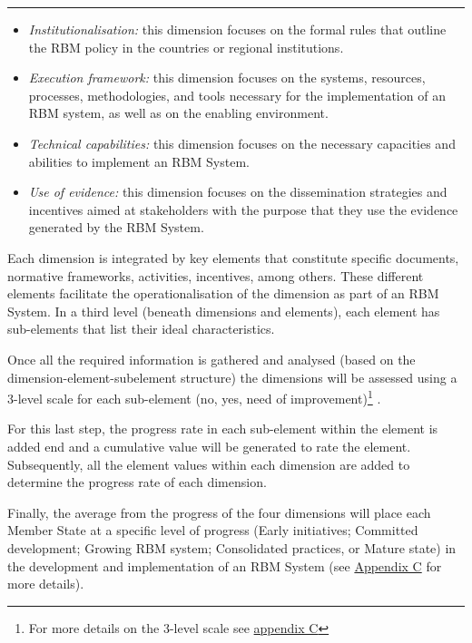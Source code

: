 \documentclass[
  10pt,
]{book}
\begin{document}
\begin{center}\rule{0.5\linewidth}{0.5pt}\end{center}

\begin{itemize}
\item
  \emph{Institutionalisation:} this dimension focuses on the formal rules that outline the RBM policy in the countries or regional institutions.
\item
  \emph{Execution framework:} this dimension focuses on the systems, resources, processes, methodologies, and tools necessary for the implementation of an RBM system, as well as on the enabling environment.
\item
  \emph{Technical capabilities:} this dimension focuses on the necessary capacities and abilities to implement an RBM System.
\item
  \emph{Use of evidence:} this dimension focuses on the dissemination strategies and incentives aimed at stakeholders with the purpose that they use the evidence generated by the RBM System.
\end{itemize}

Each dimension is integrated by key elements that constitute specific documents, normative frameworks, activities, incentives, among others. These different elements facilitate the operationalisation of the dimension as part of an RBM System. In a third level (beneath dimensions and elements), each element has sub-elements that list their ideal characteristics.

Once all the required information is gathered and analysed (based on the dimension-element-subelement structure) the dimensions will be assessed using a 3-level scale for each sub-element (no, yes, need of improvement)\footnote{For more details on the 3-level scale see \protect\hyperlink{appendixC}{appendix C}} .

For this last step, the progress rate in each sub-element within the element is added end and a cumulative value will be generated to rate the element. Subsequently, all the element values within each dimension are added to determine the progress rate of each dimension.

Finally, the average from the progress of the four dimensions will place each Member State at a specific level of progress (Early initiatives; Committed development; Growing RBM system; Consolidated practices, or Mature state) in the development and implementation of an RBM System (see \protect\hyperlink{appendixC}{Appendix C} for more details).
\end{document}
